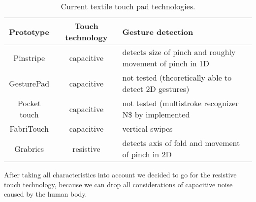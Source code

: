 \begin{table}
\begin{tabular}{|c | c | p{3.8cm}|}
  \hline
  Prototype & Touch technology & Gesture detection \\
  \hline
   Pinstripe & capacitive  & detects size of pinch and roughly movement of pinch in 1D \\
   \hline
  GesturePad & capacitive &  not tested (theoretically able to detect 2D gestures) \\
  \hline
  Pocket touch & capacitive & not tested (multistroke recognizer N\$ by \cite{anthony2012n} implemented \\
  \hline
  FabriTouch & capacitive & vertical swipes \\
  \hline
  Grabrics & resistive & detects axis of fold and movement of pinch in 2D \\ 
  \hline
\end{tabular}
\caption{Current textile touch pad technologies.}
 \label{table:overview}
\end{table}

After taking all characteristics into account we decided to go for the resistive touch technology, because we can drop all considerations of capacitive noise caused by the human body. 